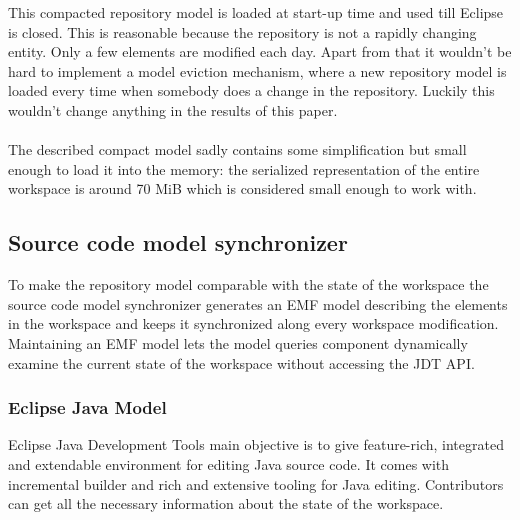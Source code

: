 This compacted repository model is loaded at start-up time and used till Eclipse
is closed. This is reasonable because the repository is not a rapidly changing
entity. Only a few elements are modified each day. Apart from that it wouldn't
be hard to implement a model eviction mechanism, where a new repository model is
loaded every time when somebody does a change in the repository. Luckily this 
wouldn't change anything in the results of this paper.  

\paragraph{}
The described compact model sadly contains some simplification but small enough to
load it into the memory: the serialized representation of the entire workspace is
around 70 MiB which is considered small enough to work with. 

\subsection{Source code model synchronizer}
To make the repository model comparable with the state of the workspace the
source code model synchronizer generates an EMF model describing the elements
in the workspace and keeps it synchronized along every workspace modification.
Maintaining an EMF model lets the model queries component dynamically examine
the current state of the workspace without accessing the JDT API.

\subsubsection{Eclipse Java Model}
Eclipse Java Development Tools main objective is to give feature-rich,
integrated and extendable environment for editing Java source code. It comes
with incremental builder and rich and extensive tooling for Java editing.
Contributors can get all the necessary information about the state of the
workspace.

